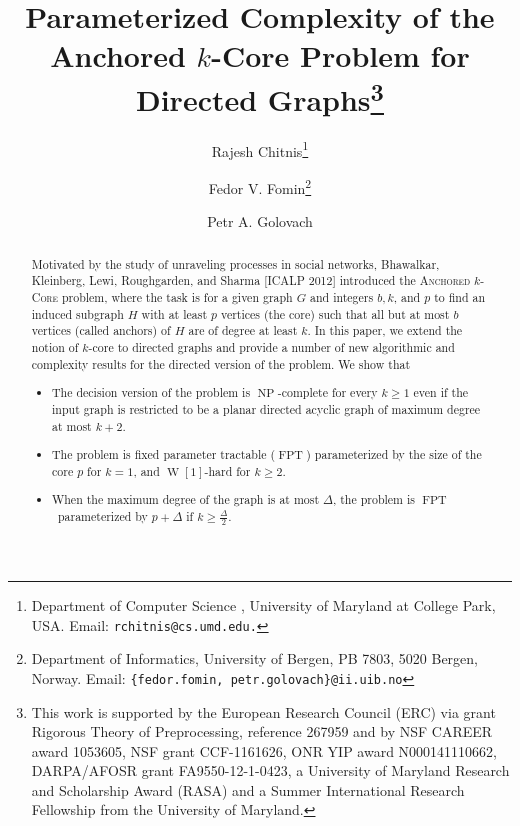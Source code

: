 \documentclass[11pt,a4paper]{article}
\DeclareMathOperator{\operatorClassNP}{NP}
\newcommand{\classNP}{\ensuremath{\operatorClassNP}}
\DeclareMathOperator{\operatorClassFPT}{FPT}
\newcommand{\classFPT}{\ensuremath{\operatorClassFPT}}
\DeclareMathOperator{\operatorClassW}{W}
\newcommand{\classW}[1]{\ensuremath{\operatorClassW[#1]}}
\begin{document}
\title{Parameterized Complexity of the Anchored $k$-Core Problem for Directed Graphs\footnote{This work is supported by the European Research Council (ERC) via grant Rigorous Theory of Preprocessing, reference
267959 and by NSF CAREER award 1053605, NSF grant CCF-1161626, ONR YIP award N000141110662, DARPA/AFOSR grant FA9550-12-1-0423, a University
of Maryland Research and Scholarship Award (RASA) and a Summer International Research Fellowship from the University of
Maryland.
}}

\author{Rajesh Chitnis\thanks{Department of Computer Science , University of Maryland at College Park, USA. Email: {\tt rchitnis@cs.umd.edu.}}
\and
Fedor V. Fomin\thanks{Department of Informatics, University of Bergen, PB 7803, 5020 Bergen, Norway. Email: {\tt{\{fedor.fomin, petr.golovach\}@ii.uib.no}}}
\addtocounter{footnote}{-1}
\and 
Petr A. Golovach\footnotemark
}




\date{}

\maketitle


\begin{abstract} Motivated by the study of  unraveling processes in social networks,
Bhawalkar,   Kleinberg,   Lewi,   Roughgarden,  and Sharma [ICALP 2012] introduced the \textsc{Anchored $k$-Core} problem,
where the task is  for a given graph $G$ and integers $b, k$, and $p$ to find an induced subgraph $H$  with at least $p$
vertices (the core) such that all but at most $b$ vertices (called anchors) of  $H$ are of
degree at least $k$. In this paper, we extend the notion of $k$-core to directed graphs and provide a number of new
algorithmic and complexity results for the directed version of the problem. We show that
\begin{itemize}
\item
The decision version of the problem is   \classNP-complete for every $k\geq 1$  even if the input graph is restricted to be a planar directed acyclic graph of maximum degree at
most $k+2$.
\item The problem is fixed parameter tractable (\classFPT) parameterized by the size of the core $p$ for  $k=1$, and \classW1-hard for $k\geq 2$.
\item When the maximum degree of the graph is at most $\Delta$,   the
 problem is  \classFPT\  parameterized by $p+\Delta$ if $k\geq \frac{\Delta}{2}$.
\end{itemize}
\end{abstract}
\end{document}
